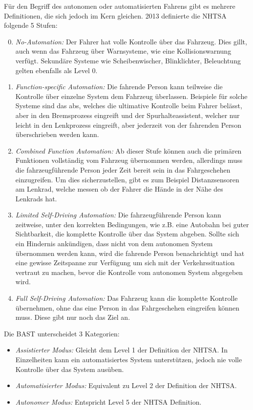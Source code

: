 \documentclass[conference,compsoc,final,a4paper]{IEEEtran}
\begin{document}
Für den Begriff des autonomen oder automatisierten Fahrens gibt es mehrere Definitionen, die sich jedoch im Kern gleichen.
2013 definierte die \ac{NHTSA} folgende 5 Stufen\cite{NHTSA2013}:
\begin{enumerate}
  \setcounter{enumi}{-1}
  \item \emph{No-Automation:} Der Fahrer hat volle Kontrolle über das Fahrzeug. Dies gillt, auch wenn das Fahrzeug über Warnsysteme, wie eine Kollisionswarnung verfügt. Sekundäre Systeme wie Scheibenwischer, Blinklichter, Beleuchtung gelten ebenfalls als Level 0.
  \item \emph{Function-specific Automation:} Die fahrende Person kann teilweise die Kontrolle über einzelne System dem Fahrzeug überlassen. Beispiele für solche Systeme sind das \ac{abs}, welches die ultimative Kontrolle beim Fahrer belässt, aber in den Bremsprozess eingreift und der Spurhalteassistent, welcher nur leicht in den Lenkprozess eingreift, aber jederzeit von der fahrenden Person überschrieben werden kann.
  \item \emph{Combined Function Automation:} Ab dieser Stufe können auch die primären Funktionen vollständig vom Fahrzeug übernommen werden, allerdings muss die fahrzeugführende Person jeder Zeit bereit sein in das Fahrgeschehen einzugreifen. Um dies sicherzustellen, gibt es zum Beispiel Distanzsensoren am Lenkrad, welche messen ob der Fahrer die Hände in der Nähe des Lenkrads hat. %
  \item \emph{Limited Self-Driving Automation:} Die fahrzeugführende Person kann zeitweise, unter den korrekten Bedingungen, wie z.B. eine Autobahn bei guter Sichtbarkeit, die komplette Kontrolle über das System abgeben. Sollte sich ein Hindernis ankündigen, dass nicht von dem autonomen System übernommen werden kann, wird die fahrende Person benachrichtigt und hat eine gewisse Zeitspanne zur Verfügung um sich mit der Verkehrssituation vertraut zu machen, bevor die Kontrolle vom autonomen System abgegeben wird.
  \item \emph{Full Self-Driving Automation:} Das Fahrzeug kann die komplette Kontrolle übernehmen, ohne das eine Person in das Fahrgeschehen eingreifen können muss. Diese gibt nur noch das Ziel an.
\end{enumerate}

Die \ac{BAST} unterscheidet 3 Kategorien\cite{bast2021}:

\begin{itemize}
  \item \emph{Assistierter Modus:} Gleicht dem Level 1 der Definition der \ac{NHTSA}. In Einzelheiten kann ein automatisiertes System unterstützen, jedoch nie volle Kontrolle über das System ausüben.
  \item \emph{Automatisierter Modus:} Equivalent zu Level 2 der Definition der \ac{NHTSA}.
  \item \emph{Autonomer Modus:} Entspricht Level 5 der \ac{NHTSA} Definition.
\end{itemize}
\end{document}
